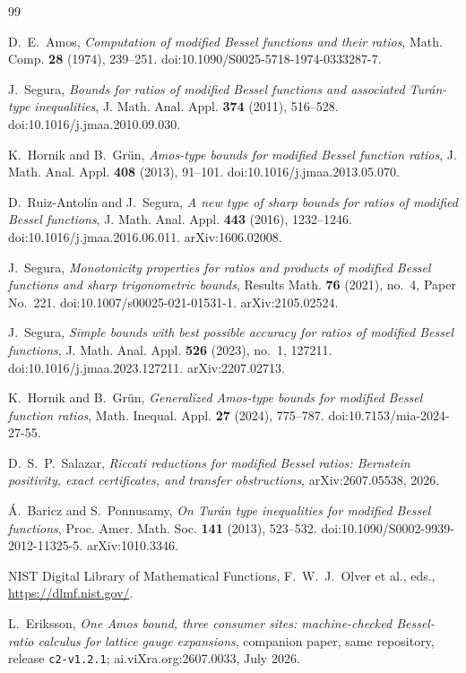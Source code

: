 \documentclass[11pt]{article}
\newcommand{\lean}[1]{\texttt{#1}}
\begin{document}
\begin{thebibliography}{99}

 D.~E.~Amos,
\emph{Computation of modified Bessel functions and their ratios},
Math. Comp. \textbf{28} (1974), 239--251.
doi:10.1090/S0025-5718-1974-0333287-7.

 J.~Segura,
\emph{Bounds for ratios of modified Bessel functions and associated
Tur\'an-type inequalities},
J. Math. Anal. Appl. \textbf{374} (2011), 516--528.
doi:10.1016/j.jmaa.2010.09.030.

 K.~Hornik and B.~Gr\"un,
\emph{Amos-type bounds for modified Bessel function ratios},
J. Math. Anal. Appl. \textbf{408} (2013), 91--101.
doi:10.1016/j.jmaa.2013.05.070.

 D.~Ruiz-Antol\'in and J.~Segura,
\emph{A new type of sharp bounds for ratios of modified Bessel
functions}, J. Math. Anal. Appl. \textbf{443} (2016), 1232--1246.
doi:10.1016/j.jmaa.2016.06.011.  arXiv:1606.02008.

 J.~Segura,
\emph{Monotonicity properties for ratios and products of modified
Bessel functions and sharp trigonometric bounds},
Results Math. \textbf{76} (2021), no.~4, Paper No.~221.
doi:10.1007/s00025-021-01531-1.  arXiv:2105.02524.

 J.~Segura,
\emph{Simple bounds with best possible accuracy for ratios of
modified Bessel functions},
J. Math. Anal. Appl. \textbf{526} (2023), no.~1, 127211.
doi:10.1016/j.jmaa.2023.127211.  arXiv:2207.02713.

 K.~Hornik and B.~Gr\"un,
\emph{Generalized Amos-type bounds for modified Bessel function
ratios}, Math. Inequal. Appl. \textbf{27} (2024), 775--787.
doi:10.7153/mia-2024-27-55.

 D.~S.~P.~Salazar,
\emph{Riccati reductions for modified Bessel ratios: Bernstein
positivity, exact certificates, and transfer obstructions},
arXiv:2607.05538, 2026.

 \'A.~Baricz and S.~Ponnusamy,
\emph{On Tur\'an type inequalities for modified Bessel functions},
Proc. Amer. Math. Soc. \textbf{141} (2013), 523--532.
doi:10.1090/S0002-9939-2012-11325-5.  arXiv:1010.3346.

 NIST Digital Library of Mathematical Functions,
F.~W.~J.~Olver et al., eds., \url{https://dlmf.nist.gov/}.

 L.~Eriksson,
\emph{One Amos bound, three consumer sites: machine-checked
Bessel-ratio calculus for lattice gauge expansions}, companion
paper, same repository, release \lean{c2-v1.2.1};
ai.viXra.org:2607.0033, July 2026.


\end{thebibliography}
\end{document}

